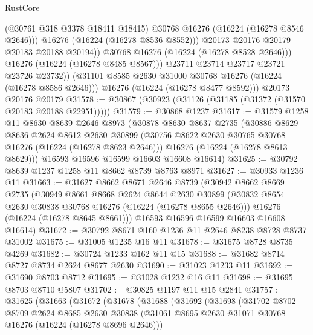 \begin{lexlean}{RustCore}
\begin{coremodule}
                      (@30761 @318 @3378 @18411 @18415)
                      @30768
                      @16276
                      (@16224 (@16278 @8546 @2646)))
                    @16276
                    (@16224 (@16278 @8536 @8552)))
                  @20173
                  @20176
                  @20179
                  @20183
                  @20188
                  @20194))
              @30768
              @16276
              (@16224 (@16278 @8528 @2646)))
            @16276
            (@16224 (@16278 @8485 @8567)))
          @23711
          @23714
          @23717
          @23721
          @23726
          @23732))
      (@31101 @8585 @2630 @31000 @30768 @16276 (@16224 (@16278 @8586 @2646)))
      @16276
      (@16224 (@16278 @8477 @8592)))
    @20173
    @20176
    @20179
@31578 := @30867 (@30923 (@31126 (@31185 (@31372 (@31570 @20183 @20188 @22951)))))
@31579 := @30868 @1237
@31617 := @31579
    @1258
    @11
    @8630
    @8639
    @2646
    @8973
    (@30878
      @8630
      @8637
      @2735
      (@30886
        @8629
        @8636
        @2624
        @8612
        @2630
        @30899
        (@30756 @8622 @2630 @30765 @30768 @16276 (@16224 (@16278 @8623 @2646)))
        @16276
        (@16224 (@16278 @8613 @8629)))
      @16593
      @16596
      @16599
      @16603
      @16608
      @16614)
@31625 := @30792 @8639 @1237 @1258 @11 @8662 @8739 @8763 @8971
@31627 := @30933 @1236 @11
@31663 := @31627
    @8662
    @8671
    @2646
    @8739
    (@30942
      @8662
      @8669
      @2735
      (@30949
        @8661
        @8668
        @2624
        @8644
        @2630
        @30899
        (@30832 @8654 @2630 @30838 @30768 @16276 (@16224 (@16278 @8655 @2646)))
        @16276
        (@16224 (@16278 @8645 @8661)))
      @16593
      @16596
      @16599
      @16603
      @16608
      @16614)
@31672 := @30792 @8671 @160 @1236 @11 @2646 @8238 @8728 @8737 @31002
@31675 := @31005 @1235 @16 @11
@31678 := @31675 @8728 @8735 @4269
@31682 := @30724 @1233 @162 @11 @15
@31688 := @31682 @8714 @8727 @8734 @2624 @8677 @2630
@31690 := @31023 @1233 @11
@31692 := @31690 @8703 @8712
@31695 := @31028 @1232 @16 @11
@31698 := @31695 @8703 @8710 @5807
@31702 := @30825 @1197 @11 @15 @2841
@31757 := @31625
    (@31663
      (@31672
        (@31678
          (@31688
            (@31692
              (@31698
                (@31702
                  @8702
                  @8709
                  @2624
                  @8685
                  @2630
                  @30838
                  (@31061 @8695 @2630 @31071 @30768 @16276 (@16224 (@16278 @8696 @2646)))

\end{coremodule}
\end{lexlean}

